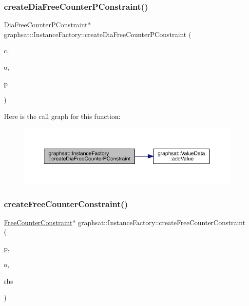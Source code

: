 \subsubsection{\texorpdfstring{createDiaFreeCounterPConstraint()}{createDiaFreeCounterPConstraint()}}
{\footnotesize\ttfamily \mbox{\hyperlink{classgraphsat_1_1_dia_free_counter_p_constraint}{Dia\+Free\+Counter\+P\+Constraint}}$\ast$ graphsat\+::\+Instance\+Factory\+::create\+Dia\+Free\+Counter\+P\+Constraint (\begin{DoxyParamCaption}\item[{int}]{c,  }\item[{\mbox{\hyperlink{namespacegraphsat_acfb5939f9bdafbd9aea0d084b9a56f69}{C\+O\+M\+P\+\_\+\+O\+P\+E\+R\+A\+T\+OR}}}]{o,  }\item[{int}]{p }\end{DoxyParamCaption})\hspace{0.3cm}{\ttfamily [inline]}}

Here is the call graph for this function\+:
\nopagebreak
\begin{figure}[H]
\begin{center}
\leavevmode
\includegraphics[width=350pt]{classgraphsat_1_1_instance_factory_a368a7bc5de4eae0d19b631e12f88e00d_cgraph}
\end{center}
\end{figure}
\mbox{\label{classgraphsat_1_1_instance_factory_a5549e171c6cfd167f94ad16b35989391}} 
\subsubsection{\texorpdfstring{createFreeCounterConstraint()}{createFreeCounterConstraint()}}
{\footnotesize\ttfamily \mbox{\hyperlink{classgraphsat_1_1_free_counter_constraint}{Free\+Counter\+Constraint}}$\ast$ graphsat\+::\+Instance\+Factory\+::create\+Free\+Counter\+Constraint (\begin{DoxyParamCaption}\item[{int}]{p,  }\item[{\mbox{\hyperlink{namespacegraphsat_acfb5939f9bdafbd9aea0d084b9a56f69}{C\+O\+M\+P\+\_\+\+O\+P\+E\+R\+A\+T\+OR}}}]{o,  }\item[{int}]{rhs }\end{DoxyParamCaption})\hspace{0.3cm}{\ttfamily [inline]}}

